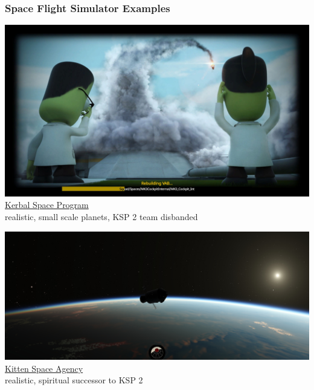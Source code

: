 \documentclass[aspectratio=169,11pt,xcolor=dvipsnames]{beamer}
\begin{document}
\begin{frame}
  \frametitle{Space Flight Simulator Examples}
  \begin{minipage}[t]{0.49\textwidth}
    \begin{center}
      \includegraphics[width=\textwidth]{ksp}\\
      \href{https://www.kerbalspaceprogram.com/}{Kerbal Space Program}\\
      realistic, small scale planets, KSP 2 team disbanded
    \end{center}
  \end{minipage}
  \begin{minipage}[t]{0.49\textwidth}
    \begin{center}
      \includegraphics[width=\textwidth]{ksa}\\
      \href{https://rocketwerkz.com/}{Kitten Space Agency}\\
      realistic, spiritual successor to KSP 2
    \end{center}
  \end{minipage}
\end{frame}
\end{document}
